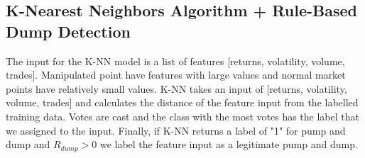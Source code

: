 \documentclass[12pt]{article}
\begin{document}
\subsection{K-Nearest Neighbors Algorithm + Rule-Based Dump Detection} 
The input for the K-NN model is a list of features [returns, volatility, volume, trades]. Manipulated point have features with large values and normal market points have relatively small values. K-NN takes an input of [returns, volatility, volume, trades] and calculates the distance of the feature input from the labelled training data. Votes are cast and the class with the most votes has the label that we assigned to the input. Finally, if K-NN returns a label of "1" for pump and dump and $R_{dump}>0$ we label the feature input as a legitimate pump and dump. 
\end{document}
